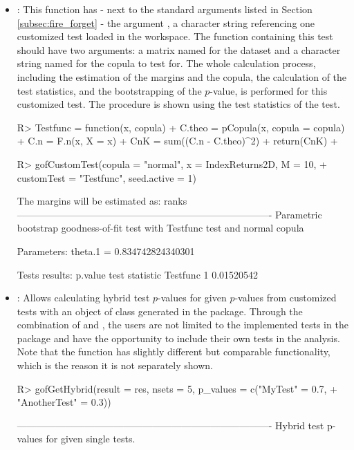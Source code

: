 \begin{itemize}
    \item {}: This function \mycolor has \bk - next to the standard arguments listed in Section \ref{subsec:fire_forget} - the argument , a character string referencing one customized test loaded in the workspace. 
    The function containing this test should have two arguments: \mycolor a matrix named  for the dataset and a character string named  for the copula to test for. \bk The whole calculation process, including the estimation of the margins and the copula, the calculation of the test statistics, and the bootstrapping of the $p$-value, is performed for this customized test. The procedure is shown using the test statistics of the  test.
\begin{example}
R> Testfunc = function(x, copula) {
+     C.theo = pCopula(x, copula = copula)
+        C.n = F.n(x, X = x)
+        CnK = sum((C.n - C.theo)^2)
+     return(CnK)
+ }

R> gofCustomTest(copula = "normal", x = IndexReturns2D, M = 10,
+                customTest = "Testfunc", seed.active = 1)
\end{example}
\begin{example}
The margins will be estimated as: ranks
-------------------------------------------------------------------------------
Parametric bootstrap goodness-of-fit test with Testfunc test and normal copula

Parameters:
theta.1 = 0.834742824340301

Tests results:
           p.value test statistic
Testfunc         1     0.01520542
\end{example}
\bigskip
    \item {}: Allows calculating hybrid test $p$-values for given $p$-values from customized tests with an object of class  generated in the package. Through the combination of  and , the users are not limited to the implemented tests in the package and have the opportunity to include their own tests in the analysis. Note that the function  has slightly different but comparable functionality, which is the reason it is not separately shown.
\begin{example}
R> gofGetHybrid(result = res, nsets = 5, p_values = c("MyTest" = 0.7,
+               "AnotherTest" = 0.3))
\end{example}
\begin{example}
-------------------------------------------------------------------------------
Hybrid test p-values for given single tests.


\end{example}
\end{itemize}
